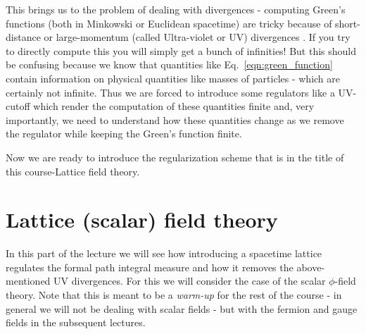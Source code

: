 \documentclass[11pt]{article}
\newcommand{\sideex}[1]{\marginnote{\footnotesize\textcolor{red!50!black}{#1}}}
\theoremstyle{definition}
\begin{document}
This brings us to the problem of dealing with divergences - computing Green's functions (both in Minkowski or Euclidean spacetime) are tricky because of short-distance or large-momentum (called Ultra-violet or UV) divergences \sideex{There is an exercise related to seeing this UV divergence in simple quantities and how a lattice tackles this.}. If you try to directly compute this you will simply get a bunch of infinities! But this should be confusing because we know that quantities like Eq.~\eqref{eqn:green_function} contain information on physical quantities like masses of particles - which are certainly not infinite. Thus we are forced to introduce some regulators like a UV-cutoff which render the computation of these quantities finite and, very importantly, we need to understand how these quantities change as we remove the regulator while keeping the Green's function finite.
 
Now we are ready to introduce the regularization scheme that is in the title of this course-Lattice field theory.

\section{Lattice (scalar) field theory}
In this part of the lecture we will see how introducing a spacetime lattice regulates the formal path integral measure and how it removes the above-mentioned UV divergences. For this we will consider the case of the scalar $\phi$-field theory. Note that this is meant to be a \textit{warm-up} for the rest of the course - in general we will not be dealing with scalar fields - but with the fermion and gauge fields in the subsequent lectures.
\end{document}
